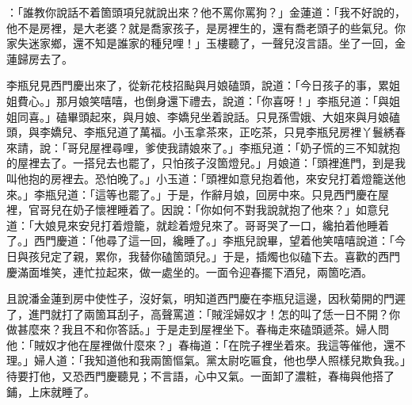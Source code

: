 ：「誰教你說話不着箇頭項兒就說出來？他不罵你罵狗？」金蓮道：「我不好說的，他不是房裡，是大老婆？就是喬家孩子，是房裡生的，還有喬老頭子的些氣兒。你家失迷家鄉，還不知是誰家的種兒哩！」玉樓聽了，一聲兒沒言語。坐了一回，金蓮歸房去了。

李瓶兒見西門慶出來了，從新花枝招颭與月娘磕頭，說道：「今日孩子的事，累姐姐費心。」{}那月娘笑嘻嘻，也倒身還下禮去，說道：「你喜呀！」李瓶兒道：「與姐姐同喜。」磕畢頭起來，與月娘、李嬌兒坐着說話。只見孫雪娥、大姐來與月娘磕頭，與李嬌兒、李瓶兒道了萬福。小玉拿茶來，正吃茶，只見李瓶兒房裡丫鬟綉春來請，說：「哥兒屋裡尋哩，爹使我請娘來了。」李瓶兒道：「奶子慌的三不知就抱的屋裡去了。一搭兒去也罷了，只怕孩子沒箇燈兒。」月娘道：「頭裡進門，到是我叫他抱的房裡去。恐怕晚了。」小玉道：「頭裡如意兒抱着他，來安兒打着燈籠送他來。」李瓶兒道：「這等也罷了。」于是，作辭月娘，回房中來。只見西門慶在屋裡，官哥兒在奶子懷裡睡着了。因說：「你如何不對我說就抱了他來？」如意兒道：「大娘見來安兒打着燈籠，就趁着燈兒來了。哥哥哭了一口，纔拍着他睡着了。」西門慶道：「他尋了這一回，纔睡了。」李瓶兒說畢，望着他笑嘻嘻說道：「今日與孩兒定了親，累你，我替你磕箇頭兒。」于是，插燭也似磕下去。喜歡的西門慶滿面堆笑，連忙拉起來，做一處坐的。一面令迎春擺下酒兒，兩箇吃酒。

且說潘金蓮到房中使性子，沒好氣，明知道西門慶在李瓶兒這邊，因秋菊開的門遲了，進門就打了兩箇耳刮子，高聲罵道：「賊淫婦奴才！怎的叫了恁一日不開？你做甚麼來？我且不和你答話。」于是走到屋裡坐下。春梅走來磕頭遞茶。婦人問他：「賊奴才他在屋裡做什麼來？」春梅道：「在院子裡坐着來。我這等催他，還不理。」婦人道：「我知道他和我兩箇慪氣。黨太尉吃匾食，他也學人照樣兒欺負我。」待要打他，又恐西門慶聽見；不言語，心中又氣。{}一面卸了濃粧，春梅與他搭了鋪，上床就睡了。

